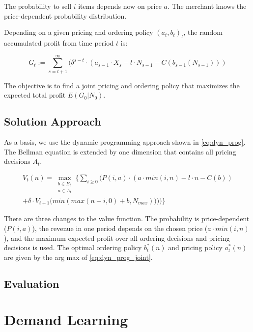 The probability to sell $i$ items depends now on price $a$.
The merchant knows the price-dependent probability distribution.

Depending on a given pricing and ordering policy $(a_t, b_t)_t$, the random accumulated profit from time period $t$ is:

$$
G_t := \sum_{s=t+1}^{\infty} (\delta^{s-t} \cdot (a_{s-1} \cdot X_s - l \cdot N_{s-1} - C(b_{s-1}(N_{s-1})))
$$

The objective is to find a joint pricing and ordering policy that maximizes the expected total profit $E(G_0 | N_0)$.

\subsection{Solution Approach}
As a basis, we use the dynamic programming approach shown in \cref{eq:dyn_prog}.
The Bellman equation is extended by one dimension that contains all pricing decisions $A_t$.

\begin{equation}
\begin{split}
V_t(n) = \max_{\substack{b \in B_t \\ a \in A_t}} \Bigg\{
\sum_{i \geq 0} \Big(
P(i, a) \cdot (
a \cdot min(i, n) %
- l \cdot n %
- C(b) %
) \\
+ \delta \cdot V_{t+1}\big(min(max(n - i, 0) + b, N_{max}))\big)
\Big)\Bigg\}
\end{split}
\label{eq:dyn_prog_joint}
\end{equation}

There are three changes to the value function.
The probability is price-dependent ($P(i, a)$), the revenue in one period depends on the chosen price ($a \cdot min(i, n)$), and the maximum expected profit over all ordering decisions and pricing decisions is used.
The optimal ordering policy $b^*_t(n)$ and pricing policy $a^*_t(n)$ are given by the arg max of \cref{eq:dyn_prog_joint}.

\subsection{Evaluation}

\section{Demand Learning}
